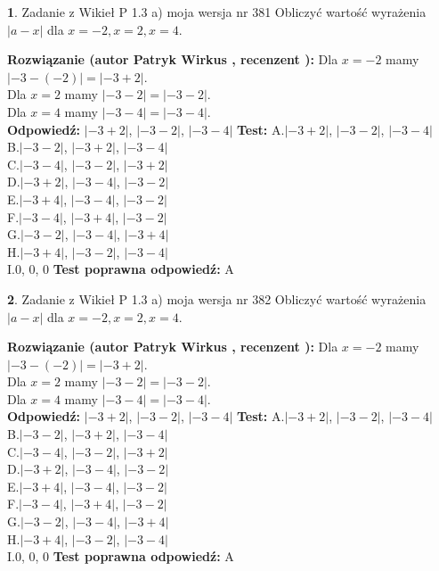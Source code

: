 \documentclass[12pt, a4paper]{article}
\theoremstyle{definition} %
\newtheorem{zad}{}
\newcommand{\zadStart}[1]{\begin{zad}#1\newline}
\newcommand{\zadStop}{\end{zad}}
\newcommand{\rozwStart}[2]{\noindent \textbf{Rozwiązanie (autor #1 , recenzent #2): }\newline}
\newcommand{\rozwStop}{\newline}
\newcommand{\odpStart}{\noindent \textbf{Odpowiedź:}\newline}
\newcommand{\odpStop}{\newline}
\newcommand{\testStart}{\noindent \textbf{Test:}\newline}
\newcommand{\testStop}{\newline}
\newcommand{\kluczStart}{\noindent \textbf{Test poprawna odpowiedź:}\newline}
\newcommand{\kluczStop}{\newline}
\begin{document}
\zadStart{Zadanie z Wikieł P 1.3 a) moja wersja nr 381}
Obliczyć wartość wyrażenia $|a - x|$ dla $x=-2,x=2,x=4$.
\zadStop
\rozwStart{Patryk Wirkus}{}
Dla $x = -2$ mamy $|-3 - (-2)| = |-3 + 2|$.\\
Dla $x = 2$ mamy $|-3 - 2| = |-3 - 2|$.\\
Dla $x = 4$ mamy $|-3 - 4| = |-3 - 4|$.\\
\rozwStop
\odpStart
$|-3 + 2|$, $|-3 - 2|$, $|-3 - 4|$
\odpStop
\testStart
A.$|-3 + 2|$, $|-3 - 2|$, $|-3 - 4|$\\
B.$|-3 - 2|$, $|-3 + 2|$, $|-3 - 4|$\\
C.$|-3 - 4|$, $|-3 - 2|$, $|-3 + 2|$\\
D.$|-3 + 2|$, $|-3 - 4|$, $|-3 - 2|$\\
E.$|-3 + 4|$, $|-3 - 4|$, $|-3 - 2|$\\
F.$|-3 - 4|$, $|-3 + 4|$, $|-3 - 2|$\\
G.$|-3 - 2|$, $|-3 - 4|$, $|-3 + 4|$\\
H.$|-3 + 4|$, $|-3 - 2|$, $|-3 - 4|$\\
I.$0$, $0$, $0$
\testStop
\kluczStart
A
\kluczStop



\zadStart{Zadanie z Wikieł P 1.3 a) moja wersja nr 382}
Obliczyć wartość wyrażenia $|a - x|$ dla $x=-2,x=2,x=4$.
\zadStop
\rozwStart{Patryk Wirkus}{}
Dla $x = -2$ mamy $|-3 - (-2)| = |-3 + 2|$.\\
Dla $x = 2$ mamy $|-3 - 2| = |-3 - 2|$.\\
Dla $x = 4$ mamy $|-3 - 4| = |-3 - 4|$.\\
\rozwStop
\odpStart
$|-3 + 2|$, $|-3 - 2|$, $|-3 - 4|$
\odpStop
\testStart
A.$|-3 + 2|$, $|-3 - 2|$, $|-3 - 4|$\\
B.$|-3 - 2|$, $|-3 + 2|$, $|-3 - 4|$\\
C.$|-3 - 4|$, $|-3 - 2|$, $|-3 + 2|$\\
D.$|-3 + 2|$, $|-3 - 4|$, $|-3 - 2|$\\
E.$|-3 + 4|$, $|-3 - 4|$, $|-3 - 2|$\\
F.$|-3 - 4|$, $|-3 + 4|$, $|-3 - 2|$\\
G.$|-3 - 2|$, $|-3 - 4|$, $|-3 + 4|$\\
H.$|-3 + 4|$, $|-3 - 2|$, $|-3 - 4|$\\
I.$0$, $0$, $0$
\testStop
\kluczStart
A
\kluczStop
\end{document}
